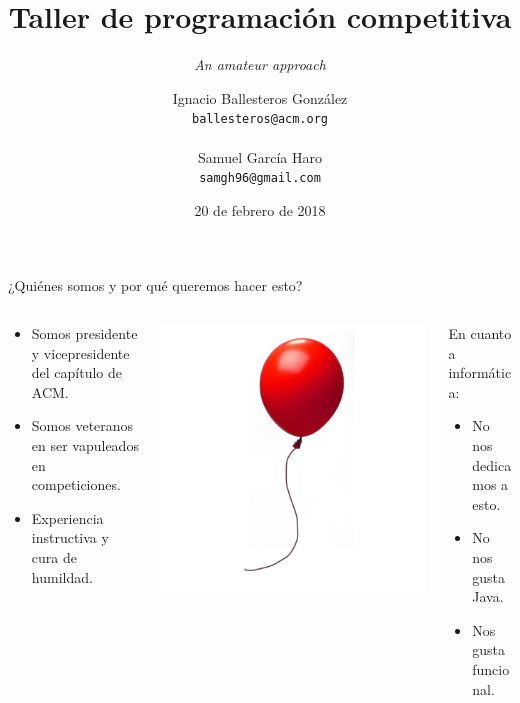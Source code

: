 \documentclass[10pt,handout]{beamer}
\title{Taller de programación competitiva}
\subtitle{\textit{An amateur approach}}
\date{20 de febrero de 2018}
\author{
  Ignacio Ballesteros González\\
  {\color{mygray}\texttt{ballesteros@acm.org}\\}
  \\
  Samuel García Haro\\
  {\color{mygray}\texttt{samgh96@gmail.com}\\}
}
\institute{}
\begin{document}
\maketitle

\begin{frame}{¿Quiénes somos y por qué queremos hacer esto?}
  \begin{columns}[onlytextwidth]
    \begin{column}{0.3\textwidth}
      \centering
      \begin{itemize}
      \item Somos presidente y vicepresidente del capítulo de ACM.
      \item Somos veteranos en ser vapuleados en competiciones.
      \item Experiencia instructiva y cura de humildad.
      \end{itemize}
    \end{column}
    \begin{column}{0.3\textwidth}
      \centering
      \includegraphics[width=\textwidth]{globo.png}
    \end{column}
    \begin{column}{0.35\textwidth}
      En cuanto a informática:
      \begin{itemize}
      \item No nos dedicamos a esto.
      \item No nos gusta Java.
      \item Nos gusta funcional.
      \end{itemize}
    \end{column}
  \end{columns}
\end{frame}
\end{document}
